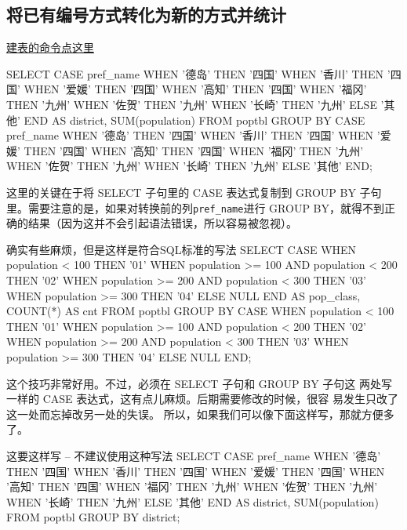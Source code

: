 \subsection{将已有编号方式转化为新的方式并统计}
\href{https://github.com/JPL-JUNO/SQL/blob/main/ASQLP/PopTbl.sql}{建表的命令点这里}
\begin{sql}{}
SELECT 
    CASE pref_name
        WHEN '德岛' THEN '四国'
        WHEN '香川' THEN '四国'
        WHEN '爱媛' THEN '四国'
        WHEN '高知' THEN '四国'
        WHEN '福冈' THEN '九州'
        WHEN '佐贺' THEN '九州'
        WHEN '长崎' THEN '九州'
        ELSE '其他'
    END AS district,
    SUM(population)
FROM
    poptbl
GROUP BY CASE pref_name
    WHEN '德岛' THEN '四国'
    WHEN '香川' THEN '四国'
    WHEN '爱媛' THEN '四国'
    WHEN '高知' THEN '四国'
    WHEN '福冈' THEN '九州'
    WHEN '佐贺' THEN '九州'
    WHEN '长崎' THEN '九州'
    ELSE '其他'
END;
\end{sql}
这里的关键在于将 SELECT 子句里的 CASE 表达式复制到 GROUP BY
子句里。需要注意的是，如果对转换前的列\verb|pref_name|进行 GROUP
BY，就得不到正确的结果（因为这并不会引起语法错误，所以容易被忽视）。
\begin{sql}{确实有些麻烦，但是这样是符合SQL标准的写法}
SELECT 
    CASE
        WHEN population < 100 THEN '01'
        WHEN population >= 100 AND population < 200 THEN '02'
        WHEN population >= 200 AND population < 300 THEN '03'
        WHEN population >= 300 THEN '04'
        ELSE NULL
    END AS pop_class,
    COUNT(*) AS cnt
FROM
    poptbl
GROUP BY CASE
    WHEN population < 100 THEN '01'
    WHEN population >= 100 AND population < 200 THEN '02'
    WHEN population >= 200 AND population < 300 THEN '03'
    WHEN population >= 300 THEN '04'
    ELSE NULL
END;
\end{sql}

这个技巧非常好用。不过，必须在 SELECT 子句和 GROUP BY 子句这
两处写一样的 CASE 表达式，这有点儿麻烦。后期需要修改的时候，很容
易发生只改了这一处而忘掉改另一处的失误。
所以，如果我们可以像下面这样写，那就方便多了。
\begin{sql}{这要这样写}
-- 不建议使用这种写法
SELECT 
    CASE pref_name
        WHEN '德岛' THEN '四国'
        WHEN '香川' THEN '四国'
        WHEN '爱媛' THEN '四国'
        WHEN '高知' THEN '四国'
        WHEN '福冈' THEN '九州'
        WHEN '佐贺' THEN '九州'
        WHEN '长崎' THEN '九州'
        ELSE '其他'
    END AS district,
    SUM(population)
FROM
    poptbl
GROUP BY district;
\end{sql}

